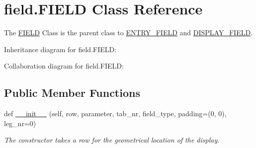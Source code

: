 \hypertarget{classfield_1_1FIELD}{}\section{field.\+F\+I\+E\+LD Class Reference}
\label{classfield_1_1FIELD}


The \hyperlink{classfield_1_1FIELD}{F\+I\+E\+LD} Class is the parent class to \hyperlink{classfield_1_1ENTRY__FIELD}{E\+N\+T\+R\+Y\+\_\+\+F\+I\+E\+LD} and \hyperlink{classfield_1_1DISPLAY__FIELD}{D\+I\+S\+P\+L\+A\+Y\+\_\+\+F\+I\+E\+LD}.  




Inheritance diagram for field.\+F\+I\+E\+LD\+:


Collaboration diagram for field.\+F\+I\+E\+LD\+:
\subsection*{Public Member Functions}
\begin{DoxyCompactItemize}
\item 
def \hyperlink{classfield_1_1FIELD_ab7abb063e678d80e62141febc7e1016c}{\+\_\+\+\_\+init\+\_\+\+\_\+} (self, row, parameter, tab\+\_\+nr, field\+\_\+type, padding=(0, 0), leg\+\_\+nr=0)
\begin{DoxyCompactList}\small\item\em The constructor takes a row for the geometrical location of the display. \end{DoxyCompactList}\end{DoxyCompactItemize}
